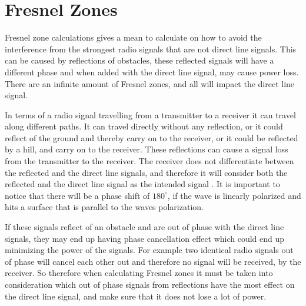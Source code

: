 \chapter{Fresnel Zones}


Fresnel zone \citep{Fres1} \citep{Fres2} calculations gives a mean to calculate on how to avoid the interference from the strongest radio signals that are not direct line signals. This can be caused by reflections of obstacles, these reflected signals will have a different phase and when added with the direct line signal, may cause power loss. There are an infinite amount of Fresnel zones, and all will impact the direct line signal.  %


In terms of a radio signal travelling from a transmitter to a receiver it can travel along different paths. It can travel directly without any reflection, %
or it could reflect of the ground and thereby carry on to the receiver, or it could be reflected by a hill, and carry on to the receiver. %
These reflections can cause a signal loss from the transmitter to the receiver. The receiver does not differentiate between the reflected and the direct line signals, and therefore it will consider both the reflected and the direct line signal as the intended signal \citep{Fres2}. It is important to notice that there will be a phase shift of $180^{\circ}$, if the wave is linearly polarized and hits a surface that is parallel to the waves polarization. 


If these signals reflect of an obstacle and are out of phase with the direct line signals, they may end up having phase cancellation effect which could end up minimizing the power of the signals. For example two identical radio signals out of phase will cancel each other out and therefore no signal will be received, by the receiver. So therefore when calculating Fresnel zones it must be taken into consideration which out of phase signals from reflections have the most effect on the direct line signal, and make sure that it does not lose a lot of power. 


